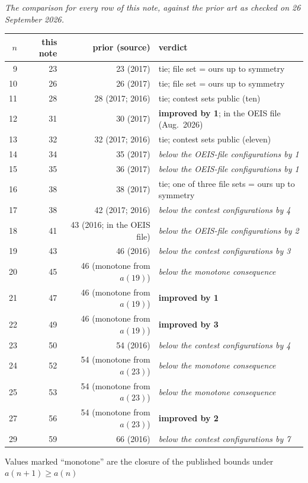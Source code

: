 \documentclass[11pt,a4paper]{article}
\begin{document}
\emph{The comparison for every row of this note, against the prior art as checked on 26 September 2026.}
\begin{center}\small
\begin{tabular}{rrrl}
\toprule
$n$ & this note & prior (source) & verdict\\
\midrule
 9 & 23 & 23 (2017) & tie; file set = ours up to symmetry\\
10 & 26 & 26 (2017) & tie; file set = ours up to symmetry\\
11 & 28 & 28 (2017; 2016) & tie; contest sets public (ten)\\
12 & 31 & 30 (2017) & \textbf{improved by 1}; in the OEIS file (Aug.\ 2026)\\
13 & 32 & 32 (2017; 2016) & tie; contest sets public (eleven)\\
14 & 34 & 35 (2017) & \emph{below the OEIS-file configurations by 1}\\
15 & 35 & 36 (2017) & \emph{below the OEIS-file configurations by 1}\\
16 & 38 & 38 (2017) & tie; one of three file sets = ours up to symmetry\\
17 & 38 & 42 (2017; 2016) & \emph{below the contest configurations by 4}\\
18 & 41 & 43 (2016; in the OEIS file) & \emph{below the OEIS-file configurations by 2}\\
19 & 43 & 46 (2016) & \emph{below the contest configurations by 3}\\
20 & 45 & 46 (monotone from $a(19)$) & \emph{below the monotone consequence}\\
21 & 47 & 46 (monotone from $a(19)$) & \textbf{improved by 1}\\
22 & 49 & 46 (monotone from $a(19)$) & \textbf{improved by 3}\\
23 & 50 & 54 (2016) & \emph{below the contest configurations by 4}\\
24 & 52 & 54 (monotone from $a(23)$) & \emph{below the monotone consequence}\\
25 & 53 & 54 (monotone from $a(23)$) & \emph{below the monotone consequence}\\
27 & 56 & 54 (monotone from $a(23)$) & \textbf{improved by 2}\\
29 & 59 & 66 (2016) & \emph{below the contest configurations by 7}\\
\bottomrule
\end{tabular}
\end{center}
Values marked ``monotone'' are the closure of the published bounds under $a(n+1)\ge a(n)$
\end{document}
